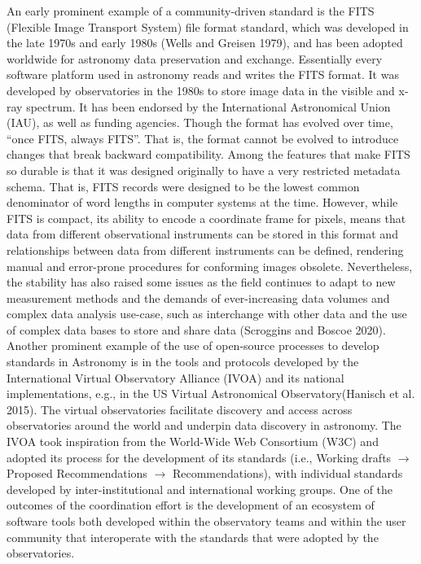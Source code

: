 \documentclass[
  letterpaper,
  DIV=11,
  numbers=noendperiod]{scrartcl}
\begin{document}
An early prominent example of a community-driven standard is the FITS
(Flexible Image Transport System) file format standard, which was
developed in the late 1970s and early 1980s (Wells and Greisen 1979),
and has been adopted worldwide for astronomy data preservation and
exchange. Essentially every software platform used in astronomy reads
and writes the FITS format. It was developed by observatories in the
1980s to store image data in the visible and x-ray spectrum. It has been
endorsed by the International Astronomical Union (IAU), as well as
funding agencies. Though the format has evolved over time, ``once FITS,
always FITS''. That is, the format cannot be evolved to introduce
changes that break backward compatibility. Among the features that make
FITS so durable is that it was designed originally to have a very
restricted metadata schema. That is, FITS records were designed to be
the lowest common denominator of word lengths in computer systems at the
time. However, while FITS is compact, its ability to encode a coordinate
frame for pixels, means that data from different observational
instruments can be stored in this format and relationships between data
from different instruments can be defined, rendering manual and
error-prone procedures for conforming images obsolete. Nevertheless, the
stability has also raised some issues as the field continues to adapt to
new measurement methods and the demands of ever-increasing data volumes
and complex data analysis use-case, such as interchange with other data
and the use of complex data bases to store and share data (Scroggins and
Boscoe 2020). Another prominent example of the use of open-source
processes to develop standards in Astronomy is in the tools and
protocols developed by the International Virtual Observatory Alliance
(IVOA) and its national implementations, e.g., in the US Virtual
Astronomical Observatory(Hanisch et al. 2015). The virtual observatories
facilitate discovery and access across observatories around the world
and underpin data discovery in astronomy. The IVOA took inspiration from
the World-Wide Web Consortium (W3C) and adopted its process for the
development of its standards (i.e., Working drafts \(\rightarrow\)
Proposed Recommendations \(\rightarrow\) Recommendations), with
individual standards developed by inter-institutional and international
working groups. One of the outcomes of the coordination effort is the
development of an ecosystem of software tools both developed within the
observatory teams and within the user community that interoperate with
the standards that were adopted by the observatories.
\end{document}

